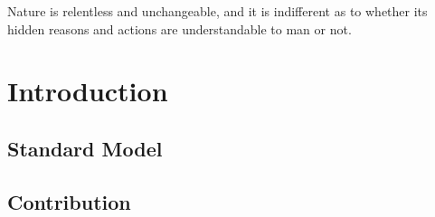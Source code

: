 \begin{savequote}[8cm]
Nature is relentless and unchangeable, and it is indifferent as to whether its hidden reasons and actions are understandable to man or not.

\end{savequote}

\chapter{\label{ch:1-intro}Introduction} 

\minitoc

\section{Standard Model}






\section{Contribution}


